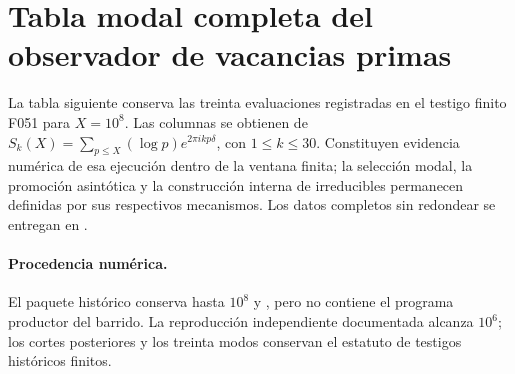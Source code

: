 \section{Tabla modal completa del observador de vacancias primas}
\label{v:f051:appendix:modal-table}

La tabla siguiente conserva las treinta evaluaciones registradas en el testigo
finito F051 para \(X=10^8\). Las columnas se obtienen de
\(S_k(X)=\sum_{p\leq X}(\log p)e^{2\pi i k p\delta}\), con
\(1\leq k\leq30\). Constituyen evidencia numérica de esa ejecución dentro de
la ventana finita; la selección modal, la promoción asintótica y la construcción
interna de irreducibles permanecen definidas por sus respectivos mecanismos. Los
datos completos sin redondear se entregan en
.

\paragraph{Procedencia numérica.}
El paquete histórico conserva  hasta \(10^8\)
y , pero no contiene el programa productor
del barrido. La reproducción independiente documentada alcanza
\(10^6\); los cortes posteriores y los treinta modos conservan el estatuto
de testigos históricos finitos.

